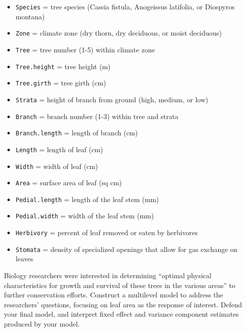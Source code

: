 \documentclass[
]{krantz}
\providecommand{\tightlist}{%
  \setlength{\itemsep}{0pt}\setlength{\parskip}{0pt}}
\begin{document}
\begin{enumerate}
  \begin{itemize}
  \tightlist
  \item
    \texttt{Species} = tree species (Cassia fistula, Anogeissus latifolia, or Diospyros montana)
  \item
    \texttt{Zone} = climate zone (dry thorn, dry deciduous, or moist deciduous)
  \item
    \texttt{Tree} = tree number (1-5) within climate zone
  \item
    \texttt{Tree.height} = tree height (m)
  \item
    \texttt{Tree.girth} = tree girth (cm)
  \item
    \texttt{Strata} = height of branch from ground (high, medium, or low)
  \item
    \texttt{Branch} = branch number (1-3) within tree and strata
  \item
    \texttt{Branch.length} = length of branch (cm)
  \item
    \texttt{Length} = length of leaf (cm)
  \item
    \texttt{Width} = width of leaf (cm)
  \item
    \texttt{Area} = surface area of leaf (sq cm)
  \item
    \texttt{Pedial.length} = length of the leaf stem (mm)
  \item
    \texttt{Pedial.width} = width of the leaf stem (mm)
  \item
    \texttt{Herbivory} = percent of leaf removed or eaten by herbivores
  \item
    \texttt{Stomata} = density of specialized openings that allow for gas exchange on leaves
  \end{itemize}

  Biology researchers were interested in determining ``optimal physical characteristics for growth and survival of these trees in the various areas'' to further conservation efforts. Construct a multilevel model to address the researchers' questions, focusing on leaf area as the response of interest. Defend your final model, and interpret fixed effect and variance component estimates produced by your model.
\end{enumerate}

  

\backmatter
\printindex
\end{document}
